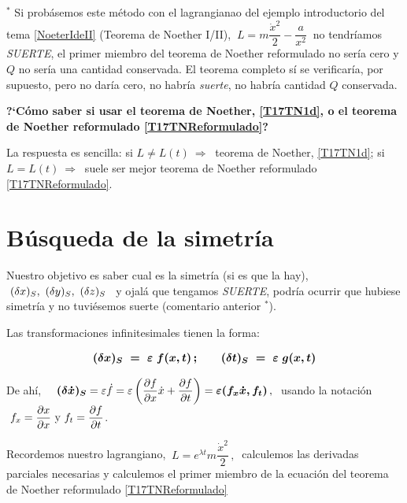 \vspace{5mm}

\begin{ejemplo}
$^*$ Si probásemos este método con el lagrangianao del ejemplo introductorio del tema \ref{NoeterIdeII} (Teorema de Noether I/II), $\ L=m\dfrac{\dot x^2}{2}-\dfrac{a}{x^2}\ $ no tendríamos \emph{SUERTE}, el primer miembro del teorema de Noether reformulado no sería cero y $Q$ no sería una cantidad conservada. El teorema completo sí se verificaría, por supuesto, pero no daría cero, no habría \emph{suerte}, no habría cantidad $Q$ conservada.
\end{ejemplo}


\vspace{10mm}

\begin{adjustwidth}{20pt}{20pt}
\begin{destacado}
\textbf{?`Cómo saber si usar el teorema de Noether, \ref{T17TN1d}, o el teorema de Noether reformulado \ref{T17TNReformulado}?}

La respuesta es sencilla: si $L\neq L(t) \ \Rightarrow \ $ teorema de Noether, \ref{T17TN1d}; si $L=L(t) \ \Rightarrow \ $ suele ser mejor teorema de Noether reformulado \ref{T17TNReformulado}.
\end{destacado}
\end{adjustwidth}

\vspace{10mm}

\section{Búsqueda de la simetría}

Nuestro objetivo es saber cual es la simetría (si es que la hay), $\ (\var x)_S,\ (\var y)_S,\ (\var z)_S \,  \   $ y ojalá que tengamos \emph{SUERTE}, podría ocurrir que hubiese simetría y no tuviésemos suerte (comentario anterior $^*$).

Las transformaciones infinitesimales tienen la forma:

$$ \boldsymbol{ (\var x)_S \ = \ \varepsilon \ f(x,t) \, ; \qquad (\var t)_S \ = \ 	\varepsilon \ g(x,t) }$$

De ahí, $\quad \displaystyle \boldsymbol{(\var \dot x)_S}=\varepsilon \dot f =\varepsilon \left( \pdv{f}{x} \dot x + \pdv{f}{t} \right) = \boldsymbol{\varepsilon (f_x \dot x , f_t)}\, , \ $ usando la notación $\ \displaystyle f_x=\pdv{x}{x} \text{ y } f_t=\pdv{f}{t}$.

Recordemos nuestro lagrangiano, $\ L=e^{\lambda t} m \dfrac{\dot x^2}{2} \, , \  $ calculemos las derivadas parciales necesarias y calculemos el primer miembro de la ecuación del teorema de Noether reformulado \ref{T17TNReformulado}

